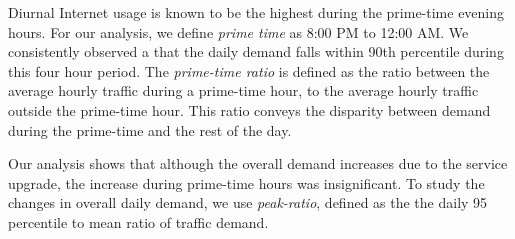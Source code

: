 Diurnal Internet usage is known to be the highest during the prime-time evening 
hours. For our analysis, we define \emph{prime time} as 8:00 PM to 12:00 AM.
We consistently observed a that the daily demand falls within 90th percentile
during this four hour period. The \emph{prime-time ratio} is defined as the
ratio between the average hourly traffic during a
prime-time hour, to the average hourly traffic outside the prime-time hour.
This ratio conveys the disparity between demand during the prime-time and
the rest of the day.

Our analysis shows that although the overall demand increases due to the 
service upgrade, the increase during prime-time hours was insignificant. 
To study the changes in overall daily demand, we use \emph{peak-ratio},
defined as the the daily 95 percentile to mean ratio of traffic demand.







%